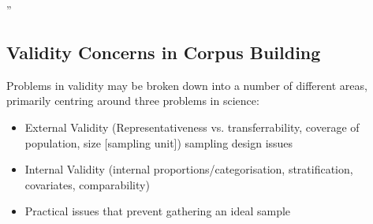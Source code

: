 ''


\subsection{Validity Concerns in Corpus Building}



Problems in validity may be broken down into a number of different areas, primarily centring around three problems in science:

\begin{itemize}
    \item External Validity (Representativeness vs. transferrability, coverage of population, size [sampling unit]) sampling design issues
    \item Internal Validity (internal proportions/categorisation, stratification, covariates, comparability)
    \item Practical issues that prevent gathering an ideal sample
\end{itemize}




